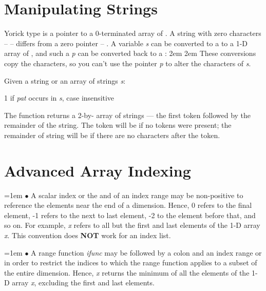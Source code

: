 \section{Manipulating Strings}

Yorick type  is a pointer to a 0-terminated
array of .  A string with zero characters --  -- differs
from a zero pointer -- .  A  variable {\it s\/}
can be converted to a  to a 1-D array of , and such
a  {\it p\/} can be converted back to a :
\begindemo
\hglue2em 
\hglue2em 
\enddemo
These conversions copy the characters, so you can't use the pointer {\it p\/}
to alter the characters of {\it s}.

Given a string or an array of strings {\it s\/}:

     {1 if {\it pat} occurs in {\it s\/}, case insensitive}

The  function returns a 2-by- array of
strings --- the first token followed by the remainder of the string.  The
token will be  if no tokens were present; the remainder of
string will be  if there are no characters after the token.

\section{Advanced Array Indexing}

\hangindent=1em
$\bullet$ A scalar index or the  and  of an index
range may be non-positive to reference the elements near the end of a
dimension.  Hence, 0 refers to the final element, -1 refers to the next
to last element, -2 to the element before that, and so on.  For example,
{\it x\/} refers to all but the first and last elements of
the 1-D array {\it x}.  This convention does {\bf NOT} work for an index
list.

\hangindent=1em
$\bullet$ A range function {\it ifunc} may be followed by a colon and an
index range  or  in order to restrict
the indices to which the range function applies to a subset of the entire
dimension.  Hence, {\it x\/} returns the minimum of all
the elements of the 1-D array {\it x}, excluding the first and last elements.

